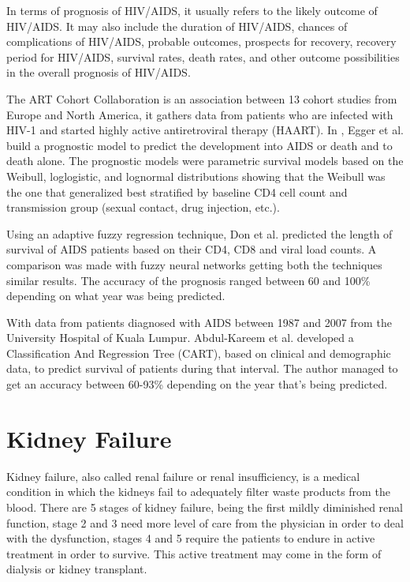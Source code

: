 In terms of prognosis of HIV/AIDS, it usually refers to the likely outcome of HIV/AIDS. It may also include the duration of HIV/AIDS, 
chances of complications of HIV/AIDS, probable outcomes, prospects for recovery, recovery period for HIV/AIDS, survival rates, death rates,
 and other outcome possibilities in the overall prognosis of HIV/AIDS. 

The ART Cohort Collaboration is an association between 13 cohort studies from Europe and North America, it gathers data from patients who
 are infected with HIV-1 and started highly active antiretroviral therapy (HAART). In \cite{Egger2002}, Egger et al. build a prognostic
 model to predict the development into AIDS or death and to death alone. The prognostic models were parametric survival models based on the 
 Weibull, loglogistic, and lognormal distributions showing that the Weibull was the one that generalized best stratified by baseline CD4 cell
 count and transmission group (sexual contact, drug injection, etc.).

Using an adaptive fuzzy regression technique, Don et al. predicted the length of survival of AIDS patients based on their CD4, CD8 and 
viral load counts. A comparison was made with fuzzy neural networks getting both the techniques similar results. The accuracy of the 
prognosis ranged between 60 and 100\% depending on what year was being predicted. \cite{Dom2009}

With data from patients diagnosed with AIDS between 1987 and 2007 from the University Hospital of Kuala Lumpur. Abdul-Kareem et al. 
developed a Classification And Regression Tree (CART), based on clinical and demographic data, to predict survival of patients during
 that interval. The author managed to get an accuracy between 60-93\% depending on the year that’s being predicted.
 \cite{AbdulKareem2010}

 \section{Kidney Failure}
 \label{section:kidney}
 
Kidney failure, also called renal failure or renal insufficiency, is a medical condition in which the kidneys fail to adequately filter waste
 products from the blood. There are 5 stages of kidney failure, being the first mildly diminished renal function, stage 2 and 3 need more 
 level of care from the physician in order to deal with the dysfunction, stages 4 and 5 require the patients to endure in active treatment
 in order to survive. This active treatment may come in the form of dialysis or kidney transplant. 


